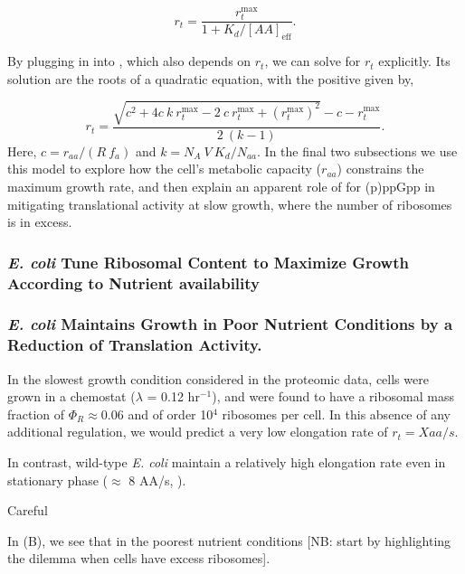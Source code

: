 \begin{equation}
r_t = \frac{r_{t}^{\text{max}}}{1 + K_d/[AA]_{\text{eff}}}.
\label{eq:rt_kd_simple}
\end{equation}

By plugging in  into , which also depends on $r_t$, we
can solve for $r_t$ explicitly. Its solution are the roots of a quadratic equation,
with the positive given by,

\begin{equation}
r_t = \frac{\sqrt{c^2 + 4 c \ k \ r_{t}^{\text{max}} - 2 \ c \ r_{t}^{\text{max}} + (r_{t}^{\text{max}})^2} - c - r_{t}^{\text{max}}}{2 \ (k-1)}.
\label{eq:rt_final}
\end{equation}
Here, $c = r_{aa}/(R \ f_a)$ and $k = N_A \ V \ K_d / N_{aa}$. In the final two
subsections we use this model to explore how the cell's metabolic capacity
($r_{aa}$) constrains the maximum growth rate, and then explain an apparent role
of for (p)ppGpp in mitigating translational activity at slow growth, where the
number of ribosomes is in excess.

\subsubsection{\textit{E. coli} Tune Ribosomal Content to
Maximize Growth According to Nutrient availability}



\subsubsection{\textit{E. coli} Maintains Growth in Poor Nutrient Conditions by a
Reduction of Translation Activity.}

In the slowest growth condition considered in the proteomic data, cells were
grown in a chemostat ($\lambda$ = 0.12 hr$^{-1}$), and were found to have a ribosomal
mass fraction of $\Phi_R \approx 0.06$ and of order 10$^4$ ribosomes per cell.
In this absence of any additional regulation, we would predict a very low elongation rate of $r_t = X aa/s$.

In contrast, wild-type \textit{E. coli} maintain a relatively high
elongation rate even in stationary phase ($\approx$ 8 AA/s, \citep{dai2016,
dai2018}).

Careful


In \FIG{}(B), we see that in the poorest nutrient conditions
[NB: start by highlighting the dilemma when cells have excess ribosomes].

